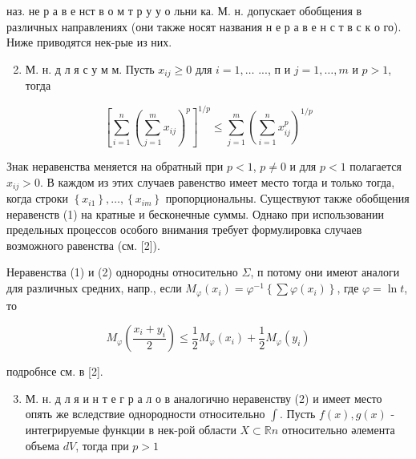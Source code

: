 \documentclass[10pt]{article}
\begin{document}
наз. не р а в е нст в о м т р у у о льни ка. М. н. допускает обобщения в различных направлениях (они также носят названия н е р а в е н с т в с к о го). Ниже приводятся нек-рые из них.



\begin{enumerate}

  \setcounter{enumi}{1}

  \item М. н. д л я с у м м. Пусть $x_{i j} \geqslant 0$ для $i=1, \ldots$ ..., $п$ и $j=1, \ldots, m$ и $p>1$, тогда

\end{enumerate}



\[

\left[\sum_{i=1}^{n}\left(\sum_{j=1}^{m} x_{i j}\right)^{p}\right]^{1 / p} \leqslant \sum_{j=1}^{m}\left(\sum_{i=1}^{n} x_{i j}^{p}\right)^{1 / p}

\]



Знак неравенства меняется на обратный при $p<1$, $p \neq 0$ и для $p<1$ полагается $x_{i j}>0$. В каждом из этих случаев равенство имеет место тогда и только тогда, когда строки $\left\{x_{i 1}\right\}, \ldots,\left\{x_{i m}\right\}$ пропорциональны. Существуют также обобщения неравенств (1) на кратные и бесконечные суммы. Однако при использовании предельных процессов особого внимания требует формулировка случаев возможного равенства (см. [2]).



Неравенства (1) и (2) однородны относительно $\Sigma$, п потому они имеют аналоги для различных средних, напр., если $M_{\varphi}\left(x_{i}\right)=\varphi^{-1}\left\{\sum \varphi\left(x_{i}\right)\right\}$, где $\varphi=\ln t$, то



\[

M_{\varphi}\left(\frac{x_{i}+y_{i}}{2}\right) \leqslant \frac{1}{2} M_{\varphi}\left(x_{i}\right)+\frac{1}{2} M_{\varphi}\left(y_{i}\right)

\]



подробнсе см. в [2].



\begin{enumerate}

  \setcounter{enumi}{2}

  \item М. н. д л я и н т е г р а л о в аналогично неравенству (2) и имеет место опять же вследствие однородности относительно $\int$. Пусть $f(x), g(x)$ - интегрируемые функции в нек-рой области $X \subset \mathbb{R} n$ относительно әлемента объема $d V$, тогда при $p>1$

\end{enumerate}
\end{document}
